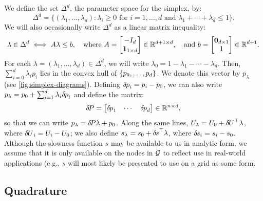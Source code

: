 \documentclass[sisc-eikonal.tex]{subfiles}
\begin{document}
We define the set $\Delta^d$, the parameter space for the simplex, by:
\begin{equation}\label{eq:Delta-set}
  \Delta^d = \big\{(\lambda_1, \hdots, \lambda_d) : \lambda_i \geq 0 \mbox{ for } i = 1, \hdots, d \mbox{ and } \lambda_1 + \cdots + \lambda_d \leq 1\big\}.
\end{equation}
We will also occasionally write $\Delta^d$ as a linear matrix inequality:
\begin{equation}\label{eq:Delta-LMI}
  \lambda \in \Delta^d \iff A\lambda \leq b, \hspace{1em} \mbox{where } A = \begin{bmatrix}
    -I_d \\ \m{1}_{1 \times d}
  \end{bmatrix} \in \mathbb{R}^{d + 1 \times d}, \hspace{1em} \mbox{and }
  b = \begin{bmatrix} \m{0}_{d \times 1} \\ 1 \end{bmatrix} \in \mathbb{R}^{d + 1}.
\end{equation}
For each $\lambda = (\lambda_1, \hdots, \lambda_d) \in \Delta^d$, we
will write $\lambda_0 = 1 - \lambda_1 - \cdots - \lambda_d$. Then,
$\sum_{i=0}^d \lambda_i p_i$ lies in the convex hull of
$\left\{p_0, \hdots, p_d\right\}$. We denote this vector by $p_\lambda$ (see
\cref{fig:simplex-diagrams}). Defining ${\delta \hspace{-0.08em} p}_i = p_i - p_0$, we
can also write $p_\lambda = p_0 + \sum_{i=1}^d \lambda_i {\delta \hspace{-0.08em} p}_i$
and define the matrix:
\begin{equation}
  {\delta \hspace{-0.14em} P} = \begin{bmatrix} {\delta \hspace{-0.08em} p}_1 & \cdots & {\delta \hspace{-0.08em} p}_d \end{bmatrix} \in \mathbb{R}^{n \times d},
\end{equation}
so that we can write $p_\lambda = {\delta \hspace{-0.14em} P} \lambda + p_0$. Along the
same lines, $U_\lambda = U_0 + {\delta \hspace{-0.09em} U}^\top \lambda$, where
${\delta \hspace{-0.09em} U}_i = U_i - U_0$; we also define
$s_\lambda = s_0 + {\delta \hspace{-0.1em} s}^\top \lambda$, where
${\delta \hspace{-0.1em} s}_i = s_i - s_0$. Although the slowness function $s$ may be
available to us in analytic form, we assume that it is only available
on the nodes in $\mathcal{G}$ to reflect use in real-world applications
(e.g., $s$ will most likely be presented to use on a grid as some
form.

\subsection{Quadrature}\label{ssec:quadrature}
\end{document}
